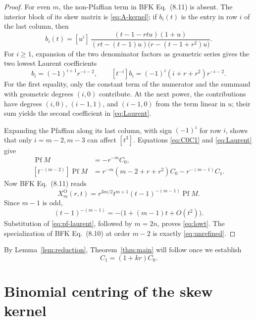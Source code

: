 \documentclass[11pt]{article}
\newcommand{\Pf}{\operatorname{Pf}}
\begin{document}
\begin{proof}
For even \(m\), the non-Pfaffian term in BFK Eq.~(8.11) is absent.
The interior block of its skew matrix is \eqref{eq:A-kernel}; if
\(b_i(t)\) is the entry in row \(i\) of the last column, then
\begin{equation}
 b_i(t)=[u^i]\,
 \frac{(t-1-rtu)(1+u)}
 {(rt-(t-1)u)\bigl(r-(t-1+r^2)u\bigr)}.
 \label{eq:last-column}
\end{equation}
For \(i\geq1\), expansion of the two denominator factors as geometric
series gives the two lowest Laurent coefficients
\begin{equation}
 [t^{-i-1}]b_i=(-1)^{i+1}r^{-i-2},\qquad
 [t^{-i}]b_i=(-1)^i(i+r+r^2)r^{-i-2}.
 \label{eq:Laurent}
\end{equation}
For the first equality, only the constant term of the numerator and the
summand with geometric degrees \((i,0)\) contribute.  At the next power,
the contributions have degrees \((i,0)\), \((i-1,1)\), and
\((i-1,0)\) from the term linear in \(u\); their sum yields the second
coefficient in \eqref{eq:Laurent}.

Expanding the Pfaffian along its last column, with sign \((-1)^i\) for
row \(i\), shows that only \(i=m-2,m-3\) can affect \([t^3]\).
Equations \eqref{eq:C0C1} and \eqref{eq:Laurent} give
\begin{align}
 [t^{-(m-1)}]\Pf M&=-r^{-m}C_0,\nonumber\\
 [t^{-(m-2)}]\Pf M
 &=r^{-m}(m-2+r+r^2)C_0-r^{-(m-1)}C_1.
 \label{eq:pf-laurent}
\end{align}
Now BFK Eq.~(8.11) reads
\[
 X^{\mathrm O}_{m}(r,t)
 =r^{3m/2}t^{m+1}(t-1)^{-(m-1)}\Pf M.
\]
Since \(m-1\) is odd,
\[
 (t-1)^{-(m-1)}
 =-\bigl(1+(m-1)t+O(t^2)\bigr).
\]
Substitution of \eqref{eq:pf-laurent}, followed by \(m=2n\), proves
\eqref{eq:lowt}.  The specialization of BFK Eq.~(8.10) at order \(m-2\)
is exactly \eqref{eq:unrefined}.
\end{proof}

By Lemma~\ref{lem:reduction}, Theorem~\ref{thm:main} will follow once we
establish
\begin{equation}
 C_1=(1+kr)C_0.
 \label{eq:minor-target}
\end{equation}

\section{Binomial centring of the skew kernel}
\end{document}
